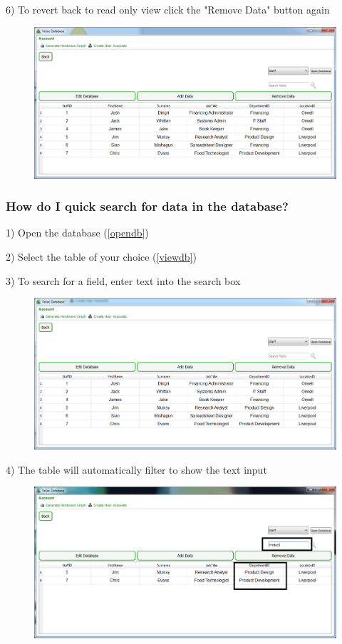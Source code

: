 6) To revert back to read only view click the "Remove Data" button again

\begin{figure}[H]
    \includegraphics[width=\textwidth]{./Manual/Images/deletedata4.png}
\end{figure}


\subsubsection{How do I quick search for data in the database?}

1) Open the database (\ref{opendb})

2) Select the table of your choice (\ref{viewdb})

3) To search for a field, enter text into the search box 

\begin{figure}[H]
    \includegraphics[width=\textwidth]{./Manual/Images/search1.png}
\end{figure}

4) The table will automatically filter to show the text input

\begin{figure}[H]
    \includegraphics[width=\textwidth]{./Manual/Images/search.png}
\end{figure}

